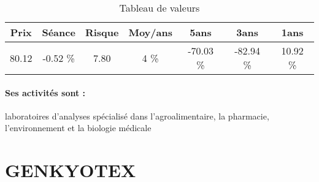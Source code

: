 \documentclass[11pt,a4paper]{report}%
\begin{document}
\begin{table}[H]
  \centering
    \begin{tabular}{|c|c|c|c|c|c|c|}
    \hline
    Prix & Séance & Risque  & Moy/ans & 5ans & 3ans & 1ans \\
    \hline
    80.12 &    -0.52 \%    & 7.80 & 4 \% & -70.03 \% & -82.94 \% & 10.92 \% \\
    \hline
    \end{tabular}%
        \label{tab:table_EUROFINS SCIENTIF}%
      \caption{Tableau de valeurs}
\end{table}%

\paragraph{Ses activités sont : } laboratoires d'analyses spécialisé dans l'agroalimentaire, la pharmacie, l'environnement et la biologie médicale 
    
    \newpage

\section{GENKYOTEX}
\end{document}
